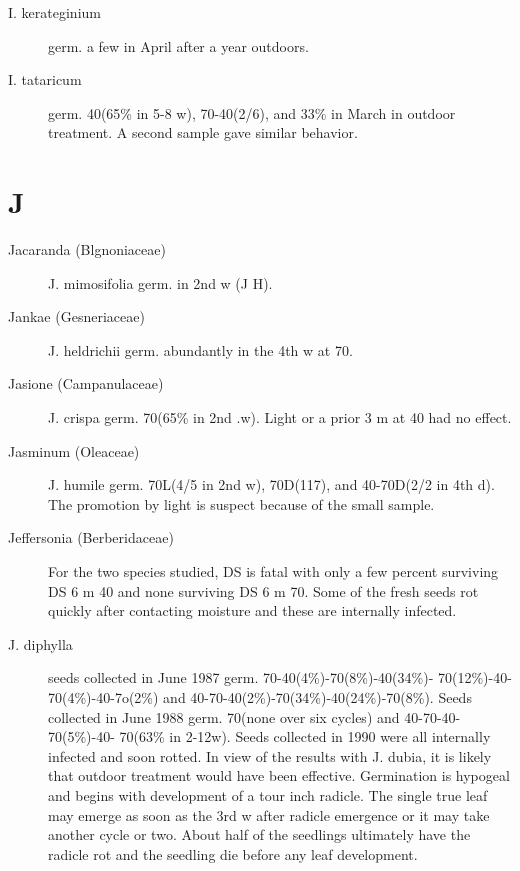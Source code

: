 \begin{description}
\item[I. kerateginium] germ. a few in April after a year outdoors.
\item[I. tataricum] germ. 40(65\% in 5-8 w), 70-40(2/6), and 33\% in March in outdoor
treatment. A second sample gave similar behavior.

\end{description}

\section{J}

\begin{description}

\item[Jacaranda (Blgnoniaceae)] J. mimosifolia germ. in 2nd w (J H).
\item[Jankae (Gesneriaceae)] J. heldrichii germ. abundantly in the 4th w at 70.
\item[Jasione (Campanulaceae)] J. crispa germ. 70(65\% in 2nd .w). Light or a
prior 3 m at 40 had no effect.
\item[Jasminum (Oleaceae)] J. humile germ. 70L(4/5 in 2nd w), 70D(117), and
40-70D(2/2 in 4th d). The promotion by light is suspect because of the small sample.

\item[Jeffersonia (Berberidaceae)] For the two species studied, DS is fatal with
only a few percent surviving DS 6 m 40 and none surviving DS 6 m 70. Some of the
fresh seeds rot quickly after contacting moisture and these are internally infected.
\item[J. diphylla] seeds collected in June 1987 germ. 70-40(4\%)-70(8\%)-40(34\%)-
70(12\%)-40-70(4\%)-40-7o(2\%) and 40-70-40(2\%)-70(34\%)-40(24\%)-70(8\%). Seeds
collected in June 1988 germ. 70(none over six cycles) and 40-70-40-70(5\%)-40-
70(63\% in 2-12w). Seeds collected in 1990 were all internally infected and soon
rotted. In view of the results with J. dubia, it is likely that outdoor treatment would have
been effective. Germination is hypogeal and begins with development of a tour inch
radicle. The single true leaf may emerge as soon as the 3rd w after radicle emergence
or it may take another cycle or two. About half of the seedlings ultimately have the
radicle rot and the seedling die before any leaf development.


\end{description}
